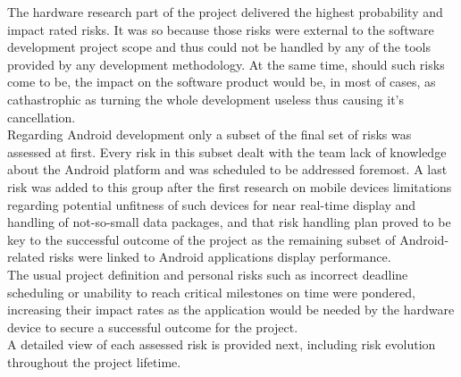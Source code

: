 		The hardware research part of the project delivered the highest probability and impact rated risks. It was so because those risks were external to the software development project scope and thus could not be handled by any of the tools provided by any development methodology. At the same time, should such risks come to be, the impact on the software product would be, in most of cases, as cathastrophic as turning the whole development useless thus causing it's cancellation.\\
		
		Regarding Android development only a subset of the final set of risks was assessed at first. Every risk in this subset dealt with the team lack of knowledge about the Android platform and was scheduled to be addressed foremost. A last risk was added to this group after the first research on mobile devices limitations regarding potential unfitness of such devices for near real-time display and handling of not-so-small data packages, and that risk handling plan proved to be key to the successful outcome of the project as the remaining subset of Android-related risks were linked to Android applications display performance.\\ %

		The usual project definition and personal risks such as incorrect deadline scheduling or unability to reach critical milestones on time were pondered, increasing their impact rates as the application would be needed by the hardware device to secure a successful outcome for the project.\\
		
		A detailed view of each assessed risk is provided next, including risk evolution throughout the project lifetime.\\

